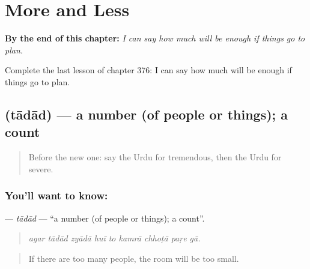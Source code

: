 
\chapter{More and Less}
\label{ch:ur-more-and-less}

\begin{chapteropening}
\textbf{By the end of this chapter:} \emph{I can say how much will be enough if things go to plan.}

Complete the last lesson of chapter 376: I can say how much will be enough if things go to plan.
\end{chapteropening}

\section[\texorpdfstring{\ur{تعداد} (tādād)}{تعداد (tādād)}]{ (tādād) — a number (of people or things); a count}

\label{lesson:UR-C376-tadad}



\begin{quote}
Before the new one: say the Urdu for tremendous, then the Urdu for severe.
\end{quote}

\subsection*{You'll want to know: }
\textbf{} — \emph{tādād} — \textquotedblleft{}a number (of people or things); a count\textquotedblright{}.

\begin{quote}
        
\end{quote}

\begin{quote}
\emph{agar tādād zyādā huī to kamrā chhoṭā paṛe gā.}
\end{quote}

\begin{quote}
If there are too many people, the room will be too small.
\end{quote}

